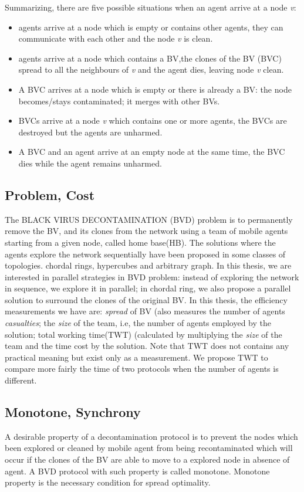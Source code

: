Summarizing, there are five possible situations when an agent arrive at a node {\em v}:
\begin{itemize}
\item agents arrive at a node which is empty or contains other agents, they can communicate with each other and the node {\em v} is clean.
\item agents arrive at a node which contains a BV,the clones of the BV (BVC) spread to all the neighbours of {\em v} and the agent dies, leaving node {\em v} clean.
\item A BVC arrives at a node which is empty or there is already a BV: the node becomes/stays contaminated; it merges with other BVs.
\item BVCs arrive at a node {\em v} which contains one or more agents, the BVCs are destroyed but the agents are unharmed.
\item A BVC and an agent arrive at an empty node at the same time, the BVC dies while the agent remains unharmed. 
\end{itemize}

\subsection{Problem, Cost}
The BLACK VIRUS DECONTAMINATION (BVD) problem is to permanently remove the BV, and its clones from the network using a team of mobile agents starting from a given node, called home base(HB). The solutions where the agents explore the network sequentially have been proposed in some classes of topologies. chordal rings, hypercubes and arbitrary graph. In this thesis, we are interested in parallel strategies in BVD problem: instead of exploring the network in sequence, we explore it in parallel; in chordal ring, we also propose a parallel solution to surround the clones of the original BV. 
In this thesis, the efficiency measurements we have are: {\em spread} of BV (also measures the number of agents {\em casualties}; the {\em size} of the team, i.e, the number of agents employed by the solution; total working time(TWT) (calculated by multiplying the {\em size} of the team and the time cost by the solution. Note that TWT does not contains any practical meaning but exist only as a measurement. We propose TWT to compare more fairly the time of two protocols when the number of agents is different.

\subsection{Monotone, Synchrony}
A desirable property of a decontamination protocol is to prevent the nodes which been explored or cleaned by mobile agent from being recontaminated which will occur if the clones of the BV are able to move to a explored node in absence of agent. A BVD protocol with such property is called monotone. Monotone property is the necessary condition for spread optimality.

